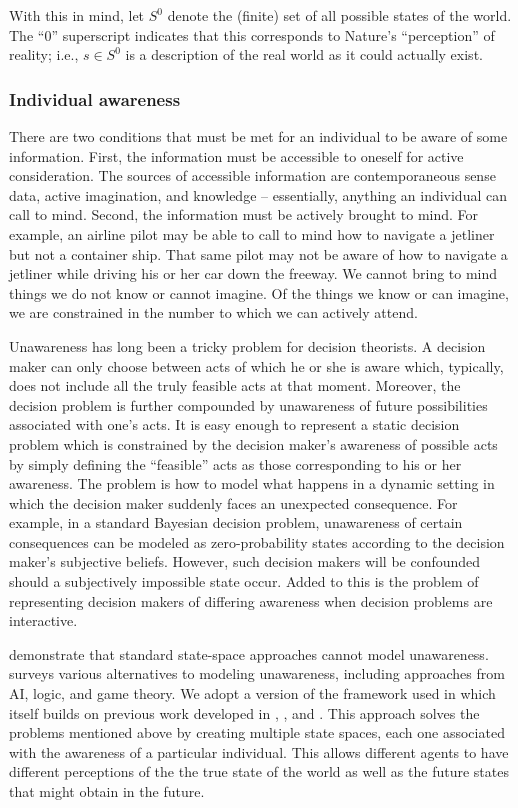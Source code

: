 \documentclass[
11pt,
titlepage,
reqno,
]{article}%
\theoremstyle{definition}
\begin{document}
	With this in mind, let $S^0$ denote the (finite) set of all possible states of the world.
	The  ``0'' superscript indicates that this corresponds to Nature's ``perception'' of reality; i.e., $s\in S^0$ is a description of the real world as it could actually exist. 

	\subsubsection{Individual awareness}


There are two conditions that must be met for an individual to be aware of some information. 
First, the information must be accessible to oneself for active consideration. 
The sources of accessible information are contemporaneous sense data, active imagination, and knowledge -- essentially, anything an individual can call to mind. 
Second, the information must be actively brought to mind. 
For example, an airline pilot may be able to call to mind how to navigate a jetliner but not a container ship. 
That same pilot may not be aware of how to navigate a jetliner while driving his or her car down the freeway. 
We cannot bring to mind things we do not know or cannot imagine.
Of the things we know or can imagine, we are constrained in the number to which we can actively attend. 

Unawareness has long been a tricky problem for decision theorists. 
A decision maker can only choose between acts of which he or she is aware which, typically, does not include all the truly feasible acts at that moment. 
Moreover, the decision problem is further compounded by unawareness of future possibilities associated with one's acts. 
It is easy enough to represent a static decision problem which is constrained by the decision maker's awareness of possible acts by simply  defining the ``feasible'' acts as those corresponding to his or her awareness.
The problem is how to model what happens in a dynamic setting in which the decision maker suddenly faces an unexpected consequence. 
For example, in a standard Bayesian decision problem, unawareness of certain consequences can be modeled as zero-probability states according to the decision maker's subjective beliefs. 
However, such decision makers will be confounded should a subjectively impossible state occur. 
Added to this is the problem of representing decision makers of differing awareness when decision problems are interactive. 

\citet{Dekel1998} demonstrate that standard state-space approaches cannot model unawareness. \citet{Schipper2015} surveys various alternatives to modeling unawareness, including approaches from  AI, logic, and game theory. We adopt a version of the framework used in   \cite{bryan2020value} which itself builds on previous work developed in \citet{Heifetz2006}, \citet{Heifetz2008}, and \citet{Heifetz2013}. This approach solves the problems mentioned above by creating multiple state spaces, each one associated with the awareness of a particular individual. This allows different agents to have different perceptions of the the true state of the world as well as the future states that might obtain in the future. 
\end{document}
